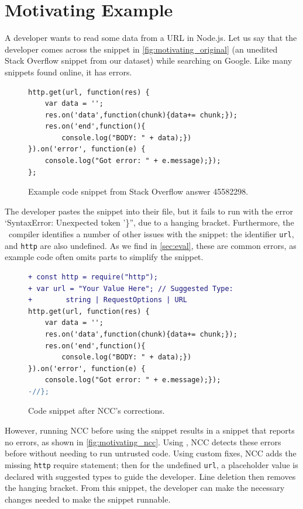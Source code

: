 \documentclass[conference]{IEEEtran}
\begin{document}
\section{Motivating Example}
\label{sec:example}

A developer wants to read some data from a URL in Node.js. Let us say that the developer comes across the snippet in \autoref{fig:motivating_original} (an unedited Stack Overflow snippet from our dataset) while searching on Google. Like many snippets found online, it has errors.

\begin{figure}[h]
    \centering
    \centering\begin{lstlisting}
http.get(url, function(res) {
    var data = '';
    res.on('data',function(chunk){data+= chunk;});
    res.on('end',function(){
        console.log("BODY: " + data);})
}).on('error', function(e) {
    console.log("Got error: " + e.message);});
};
    \end{lstlisting}
    \caption{Example code snippet from Stack Overflow answer 45582298.}
    \label{fig:motivating_original}
\end{figure}

The developer pastes the snippet into their file, but it fails to run with the error `SyntaxError: Unexpected token '\}'', due to a hanging bracket. Furthermore, the \ts\ compiler identifies a number of other issues with the snippet: the identifier \texttt{url}, and \texttt{http} are also undefined. As we find in \autoref{sec:eval}, these are common errors, as example code often omits parts to simplify the snippet.

\begin{figure}[h]
    \centering
    \begin{lstlisting}[language=diff]
+ const http = require("http");
+ var url = "Your Value Here"; // Suggested Type: 
+        string | RequestOptions | URL
http.get(url, function(res) {
    var data = '';
    res.on('data',function(chunk){data+= chunk;});
    res.on('end',function(){
        console.log("BODY: " + data);})
}).on('error', function(e) {
    console.log("Got error: " + e.message);});
-//};
    \end{lstlisting}
    \caption{Code snippet after NCC's corrections.}
    \label{fig:motivating_ncc}
\end{figure}

However, running NCC before using the snippet results in a snippet that reports no errors, as shown in \autoref{fig:motivating_ncc}. Using \ts{}, NCC detects these errors before without needing to run untrusted code. Using custom fixes, NCC adds the missing \texttt{http} require statement; then for the undefined \texttt{url}, a placeholder value is declared with suggested types to guide the developer. Line deletion then removes the hanging bracket. From this snippet, the developer can make the necessary changes needed to make the snippet runnable.
\end{document}
